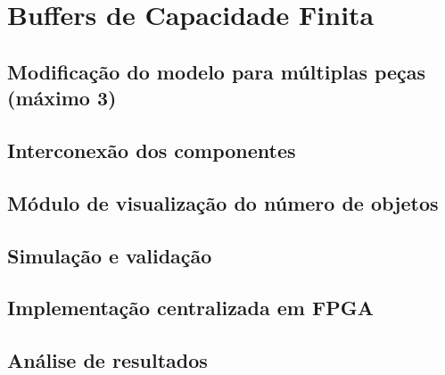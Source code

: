 \section{Buffers de Capacidade Finita}

\subsection{Modificação do modelo para múltiplas peças (máximo 3)}

\subsection{Interconexão dos componentes}

\subsection{Módulo de visualização do número de objetos}

\subsection{Simulação e validação}

\subsection{Implementação centralizada em FPGA}

\subsection{Análise de resultados}

